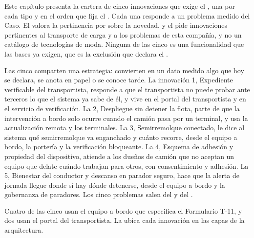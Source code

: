 %

Este capítulo presenta la cartera de cinco innovaciones que exige el , una por cada tipo
y en el orden que fija el . Cada una responde a un problema medido del Caso.
El  valora la pertinencia por sobre la novedad, y el  pide
innovaciones pertinentes al transporte de carga y a los problemas de esta compañía, y no un catálogo de
tecnologías de moda. Ninguna de las cinco es una funcionalidad que las bases ya exigen, que es la
exclusión que declara el .

Las cinco comparten una estrategia: convierten en un dato medido algo que hoy se declara, se anota en
papel o se conoce tarde. La innovación 1, Expediente
verificable del transportista, responde a que el transportista no puede probar ante terceros lo que el
sistema ya sabe de él, y vive en el portal del transportista y en el servicio de verificación. La 2,
Despliegue sin detener la flota, parte de que la intervención a bordo solo ocurre cuando el camión pasa
por un terminal, y usa la actualización remota y los terminales. La 3, Semirremolque conectado, le dice
al sistema qué semirremolque va enganchado y cuánto recorre, desde el equipo a bordo, la portería y la
verificación bloqueante. La 4, Esquema de adhesión y propiedad del dispositivo, atiende a los dueños de
camión que no aceptan un equipo que delate cuándo trabajan para otros, con consentimiento y adhesión.
La 5, Bienestar del conductor y descanso en parador seguro, hace que la alerta de jornada llegue donde
sí hay dónde detenerse, desde el equipo a bordo y la gobernanza de paradores. Los cinco problemas salen
del  y del .

Cuatro de las cinco usan el equipo a bordo que especifica el Formulario T-11, y dos usan el portal del
transportista. La  ubica cada innovación en las capas de la arquitectura.

